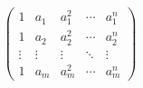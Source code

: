 \documentclass[12pt]{article}
\begin{document}
\begin{align*}
\begin{pmatrix}
  1 & a_1 & a_1^2 & \cdots & a_1^n \\
  1 & a_2 & a_2^2 & \cdots & a_2^n \\
  \vdots  & \vdots& \vdots & \ddots & \vdots \\
  1 & a_m & a_m^2 & \cdots & a_m^n    
  \end{pmatrix}
\end{align*}
\end{document}
